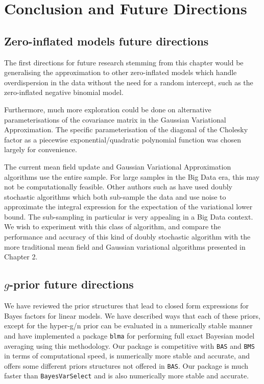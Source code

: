 \chapter{Conclusion and Future Directions}

\section{Zero-inflated models future directions}
		
The first directions for future research stemming from this chapter would be
generalising the approximation to other zero-inflated models which handle
overdispersion in the data without the need for a random intercept, such as the
zero-inflated negative binomial model.

Furthermore, much more exploration could be done on alternative
parameterisations of the covariance matrix in the Gaussian Variational
Approximation. The specific parameterisation of the diagonal of the Cholesky
factor as a piecewise exponential/quadratic polynomial function was chosen
largely for convenience.

The current mean field update and Gaussian Variational Approximation algorithms
use the entire sample. For large samples in the Big Data era, this may not be
computationally feasible. Other authors such as \cite{Tan2018} have used doubly
stochastic algorithms which both sub-sample the data and use noise to
approximate the integral expression for the expectation of the variational
lower bound. The sub-sampling in particular is very appealing in a Big Data
context. We wish to experiment with this class of algorithm, and compare the
performance and accuracy of this kind of doubly stochastic algorithm with the
more traditional mean field and Gaussian variational algorithms presented in
Chapter 2.

\section{$g$-prior future directions}

We have reviewed the prior structures that lead to closed form expressions for
Bayes factors for linear models. We have described ways that each of these
priors, except for the hyper-g/n prior can be evaluated in a numerically stable
manner and have implemented a package \texttt{blma} for performing full exact
Bayesian model averaging using this methodology. Our package is competitive
with \texttt{BAS} and \texttt{BMS} in terms of computational speed, is
numerically more stable and accurate, and offers some different priors
structures not offered in \texttt{BAS}. Our package is much faster than
\texttt{BayesVarSelect} and is also numerically more stable and accurate.

